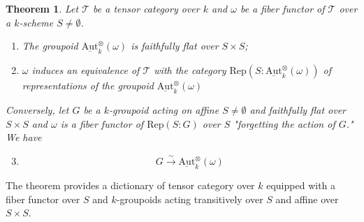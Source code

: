 \documentclass{article}
\newtheorem{theorem}[term]{Theorem}
\begin{document}
\begin{theorem}
  Let $\mathcal T$ be a tensor category over $k$ and $\omega$ be a fiber functor of $\mathcal T$  over a 
  $k$-scheme $S \neq \emptyset$.
  \begin{enumerate}
    \item The groupoid $\underline{\text{Aut}}^\otimes _k (\omega)$ is faithfully flat over $S \times S$;
    \item $\omega$ induces an equivalence of $\mathcal T$ with  the category 
      $\text{Rep}(S:\underline{\text{Aut}}^\otimes _k (\omega))$ of representations of the groupoid 
      $\underline{\text{Aut}}^\otimes _k (\omega)$
  \end{enumerate}
  Conversely,  let $G$ be a $k$-groupoid acting on affine $S \neq \emptyset$ and faithfully flat over $S \times S$ 
  and $\omega$ is a fiber functor of $\text{Rep}(S:G)$ over $S$ "forgetting the action of $G$." We have 
  \begin{enumerate}
      \setcounter{enumi}{2}
    \item  $$G \xrightarrow \sim \underline{\text{Aut}}_k ^\otimes (\omega)$$
  \end{enumerate}
\end{theorem}
  The theorem provides a dictionary of tensor category over $k$ equipped with a fiber functor over $S$ and 
  $k$-groupoids acting transitively over $S$ and affine over $S\times S$.
\end{document}
